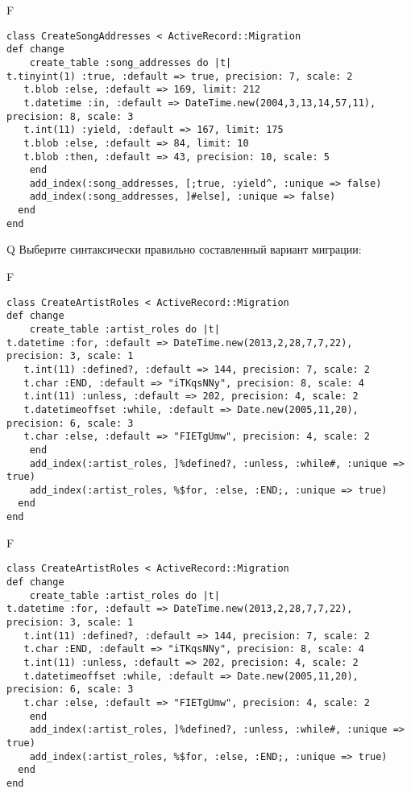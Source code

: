 F
\begin{verbatim}
class CreateSongAddresses < ActiveRecord::Migration
def change
	create_table :song_addresses do |t|
t.tinyint(1) :true, :default => true, precision: 7, scale: 2
   t.blob :else, :default => 169, limit: 212
   t.datetime :in, :default => DateTime.new(2004,3,13,14,57,11), precision: 8, scale: 3
   t.int(11) :yield, :default => 167, limit: 175
   t.blob :else, :default => 84, limit: 10
   t.blob :then, :default => 43, precision: 10, scale: 5
   	end
	add_index(:song_addresses, [;true, :yield^, :unique => false)
 	add_index(:song_addresses, ]#else], :unique => false)
  end 
end

\end{verbatim}

Q
Выберите синтаксически правильно составленный вариант миграции:

F
\begin{verbatim}
class CreateArtistRoles < ActiveRecord::Migration
def change
	create_table :artist_roles do |t|
t.datetime :for, :default => DateTime.new(2013,2,28,7,7,22), precision: 3, scale: 1
   t.int(11) :defined?, :default => 144, precision: 7, scale: 2
   t.char :END, :default => "iTKqsNNy", precision: 8, scale: 4
   t.int(11) :unless, :default => 202, precision: 4, scale: 2
   t.datetimeoffset :while, :default => Date.new(2005,11,20), precision: 6, scale: 3
   t.char :else, :default => "FIETgUmw", precision: 4, scale: 2
   	end
	add_index(:artist_roles, ]%defined?, :unless, :while#, :unique => true)
 	add_index(:artist_roles, %$for, :else, :END;, :unique => true)
  end 
end

\end{verbatim}

F
\begin{verbatim}
class CreateArtistRoles < ActiveRecord::Migration
def change
	create_table :artist_roles do |t|
t.datetime :for, :default => DateTime.new(2013,2,28,7,7,22), precision: 3, scale: 1
   t.int(11) :defined?, :default => 144, precision: 7, scale: 2
   t.char :END, :default => "iTKqsNNy", precision: 8, scale: 4
   t.int(11) :unless, :default => 202, precision: 4, scale: 2
   t.datetimeoffset :while, :default => Date.new(2005,11,20), precision: 6, scale: 3
   t.char :else, :default => "FIETgUmw", precision: 4, scale: 2
   	end
	add_index(:artist_roles, ]%defined?, :unless, :while#, :unique => true)
 	add_index(:artist_roles, %$for, :else, :END;, :unique => true)
  end 
end

\end{verbatim}


